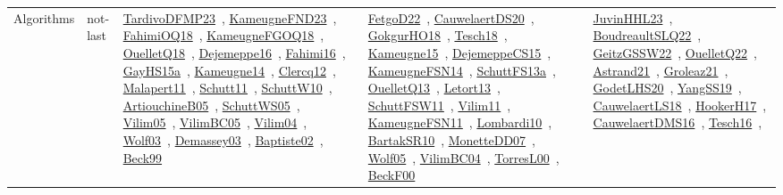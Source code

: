 {\begin{longtable}{lp{3cm}>{\raggedright\arraybackslash}p{6cm}>{\raggedright\arraybackslash}p{6cm}>{\raggedright\arraybackslash}p{8cm}}
Algorithms & not-last & \href{works/TardivoDFMP23.pdf}{TardivoDFMP23}~\cite{TardivoDFMP23}, \href{works/KameugneFND23.pdf}{KameugneFND23}~\cite{KameugneFND23}, \href{works/FahimiOQ18.pdf}{FahimiOQ18}~\cite{FahimiOQ18}, \href{works/KameugneFGOQ18.pdf}{KameugneFGOQ18}~\cite{KameugneFGOQ18}, \href{works/OuelletQ18.pdf}{OuelletQ18}~\cite{OuelletQ18}, \href{works/Dejemeppe16.pdf}{Dejemeppe16}~\cite{Dejemeppe16}, \href{works/Fahimi16.pdf}{Fahimi16}~\cite{Fahimi16}, \href{works/GayHS15a.pdf}{GayHS15a}~\cite{GayHS15a}, \href{works/Kameugne14.pdf}{Kameugne14}~\cite{Kameugne14}, \href{works/Clercq12.pdf}{Clercq12}~\cite{Clercq12}, \href{works/Malapert11.pdf}{Malapert11}~\cite{Malapert11}, \href{works/Schutt11.pdf}{Schutt11}~\cite{Schutt11}, \href{works/SchuttW10.pdf}{SchuttW10}~\cite{SchuttW10}, \href{works/ArtiouchineB05.pdf}{ArtiouchineB05}~\cite{ArtiouchineB05}, \href{works/SchuttWS05.pdf}{SchuttWS05}~\cite{SchuttWS05}, \href{works/Vilim05.pdf}{Vilim05}~\cite{Vilim05}, \href{works/VilimBC05.pdf}{VilimBC05}~\cite{VilimBC05}, \href{works/Vilim04.pdf}{Vilim04}~\cite{Vilim04}, \href{works/Wolf03.pdf}{Wolf03}~\cite{Wolf03}, \href{works/Demassey03.pdf}{Demassey03}~\cite{Demassey03}, \href{works/Baptiste02.pdf}{Baptiste02}~\cite{Baptiste02}, \href{works/Beck99.pdf}{Beck99}~\cite{Beck99} & \href{works/FetgoD22.pdf}{FetgoD22}~\cite{FetgoD22}, \href{works/CauwelaertDS20.pdf}{CauwelaertDS20}~\cite{CauwelaertDS20}, \href{works/GokgurHO18.pdf}{GokgurHO18}~\cite{GokgurHO18}, \href{works/Tesch18.pdf}{Tesch18}~\cite{Tesch18}, \href{works/Kameugne15.pdf}{Kameugne15}~\cite{Kameugne15}, \href{works/DejemeppeCS15.pdf}{DejemeppeCS15}~\cite{DejemeppeCS15}, \href{works/KameugneFSN14.pdf}{KameugneFSN14}~\cite{KameugneFSN14}, \href{works/SchuttFS13a.pdf}{SchuttFS13a}~\cite{SchuttFS13a}, \href{works/OuelletQ13.pdf}{OuelletQ13}~\cite{OuelletQ13}, \href{works/Letort13.pdf}{Letort13}~\cite{Letort13}, \href{works/SchuttFSW11.pdf}{SchuttFSW11}~\cite{SchuttFSW11}, \href{works/Vilim11.pdf}{Vilim11}~\cite{Vilim11}, \href{works/KameugneFSN11.pdf}{KameugneFSN11}~\cite{KameugneFSN11}, \href{works/Lombardi10.pdf}{Lombardi10}~\cite{Lombardi10}, \href{works/BartakSR10.pdf}{BartakSR10}~\cite{BartakSR10}, \href{works/MonetteDD07.pdf}{MonetteDD07}~\cite{MonetteDD07}, \href{works/Wolf05.pdf}{Wolf05}~\cite{Wolf05}, \href{works/VilimBC04.pdf}{VilimBC04}~\cite{VilimBC04}, \href{works/TorresL00.pdf}{TorresL00}~\cite{TorresL00}, \href{works/BeckF00.pdf}{BeckF00}~\cite{BeckF00} & \href{works/JuvinHHL23.pdf}{JuvinHHL23}~\cite{JuvinHHL23}, \href{works/BoudreaultSLQ22.pdf}{BoudreaultSLQ22}~\cite{BoudreaultSLQ22}, \href{works/GeitzGSSW22.pdf}{GeitzGSSW22}~\cite{GeitzGSSW22}, \href{works/OuelletQ22.pdf}{OuelletQ22}~\cite{OuelletQ22}, \href{works/Astrand21.pdf}{Astrand21}~\cite{Astrand21}, \href{works/Groleaz21.pdf}{Groleaz21}~\cite{Groleaz21}, \href{works/GodetLHS20.pdf}{GodetLHS20}~\cite{GodetLHS20}, \href{works/YangSS19.pdf}{YangSS19}~\cite{YangSS19}, \href{works/CauwelaertLS18.pdf}{CauwelaertLS18}~\cite{CauwelaertLS18}, \href{works/HookerH17.pdf}{HookerH17}~\cite{HookerH17}, \href{works/CauwelaertDMS16.pdf}{CauwelaertDMS16}~\cite{CauwelaertDMS16}, \href{works/Tesch16.pdf}{Tesch16}~\cite{Tesch16}, 
\end{longtable}}
